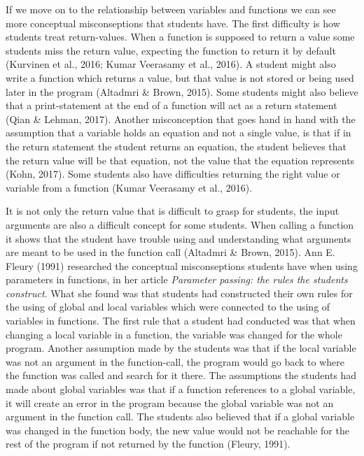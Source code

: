 \documentclass[twocolumn]{article}
\begin{document}
If we move on to the relationship between variables and functions we can see more conceptual misconseptions that students have. The first difficulty is how students treat return-values. When a function is supposed to return a value some students miss the return value, expecting the function to return it by default (Kurvinen et al., 2016; Kumar Veerasamy et al., 2016). A student might also write a function which returns a value, but that value is not stored or being used later in the program (Altadmri \& Brown, 2015). Some students might also believe that a print-statement at the end of a function will act as a return statement (Qian \& Lehman, 2017). Another misconception that goes hand in hand with the assumption that a variable holds an equation and not a single value, is that if in the return statement the student returns an equation, the student believes that the return value will be that equation, not the value that the equation represents (Kohn, 2017). Some students also have difficulties returning the right value or variable from a function (Kumar Veerasamy et al., 2016). 

It is not only the return value that is difficult to grasp for students, the input arguments are also a difficult concept for some students. When calling a function it shows that the student have trouble using and understanding what arguments are meant to be used in the function call (Altadmri \& Brown, 2015). Ann E. Fleury (1991) researched the conceptual misconseptions students have when using parameters in functions, in her article \emph{Parameter passing: the rules the students construct}. What she found was that students had constructed their own rules for the using of global and local variables which were connected to the using of variables in functions. The first rule that a student had conducted was that when changing a local variable in a function, the variable was changed for the whole program. Another assumption made by the students was that if the local variable was not an argument in the function-call, the program would go back to where the function was called and search for it there. The assumptions the students had made about global variables was that if a function references to a global variable, it will create an error in the program because the global variable was not an argument in the function call. The students also believed that if a global variable was changed in the function body, the new value would not be reachable for the rest of the program if not returned by the function (Fleury, 1991).
\end{document}

